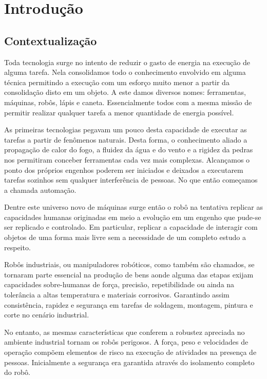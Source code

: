 \chapter{Introdução} \label{ch:intro}


\section{Contextualização}


Toda tecnologia surge no intento de reduzir o gasto de energia na execução de alguma tarefa. Nela consolidamos todo o conhecimento envolvido em alguma técnica permitindo a execução com um esforço muito menor a partir da consolidação disto em um objeto. A este damos diversos nomes: ferramentas, máquinas, robôs, lápis e caneta. Essencialmente todos com a mesma missão de permitir realizar qualquer tarefa a menor quantidade de energia possível.

As primeiras tecnologias pegavam um pouco desta capacidade de executar as tarefas a partir de fenômenos naturais. Desta forma, o conhecimento aliado a propagação de calor do fogo, a fluidez da água e do vento e a rigidez da pedras nos permitiram conceber ferramentas cada vez mais complexas. Alcançamos o ponto dos próprios engenhos poderem ser iniciados e deixados a executarem tarefas sozinhos sem qualquer interferência de pessoas. No que então começamos a chamada automação.


Dentre este universo novo de máquinas surge então o robô na tentativa replicar as capacidades humanas originadas em meio a evolução em um engenho que pude-se ser replicado e controlado. Em particular, replicar a capacidade de interagir com objetos de uma forma mais livre sem a necessidade de um completo estudo a respeito.

Robôs industriais, ou manipuladores robóticos, como também são chamados, se tornaram parte essencial na produção de bens aonde alguma das etapas exijam capacidades sobre-humanas de força, precisão, repetibilidade ou ainda na tolerância a altas temperatura e materiais corrosivos. Garantindo assim consistência, rapidez e segurança em tarefas de soldagem, montagem, pintura e corte no cenário industrial.

No entanto, as mesmas características que conferem a robustez apreciada no ambiente industrial tornam os robôs perigosos. A força, peso e velocidades de operação compõem elementos de risco na execução de atividades na presença de pessoas. Inicialmente a segurança era garantida através do isolamento completo do robô.


